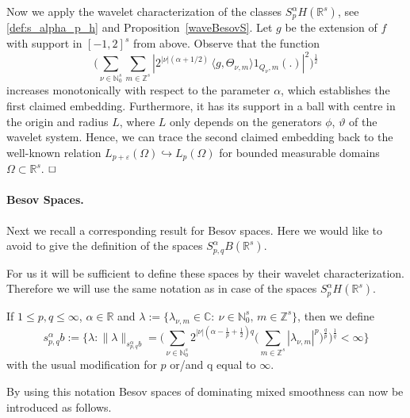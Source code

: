 \documentclass[12pt]{article}
\newenvironment{proof}{\begin{trivlist}
    \item[\hskip\labelsep{\it Proof.}]}{$\hfill\Box$\end{trivlist}}
\newcommand{\real}{\mathbb{R}}
\begin{document}
\begin{proof}
Now we  apply the wavelet characterization of the classes  $S^{\alpha}_{p}H(\real^s)$, see \eqref{def:s_alpha_p_h} and Proposition~\ref{waveBesovS}.  
Let $g$ be the extension of $f$ with support in $[-1,2]^s$ from above.
Observe that the function 
\[
\Big(\sum_{{\nu}\in \mathbb{N}_0^s}\sum_{{m}\in \mathbb{Z}^s}|2^{|{\nu}| (\alpha + 1/2)} \,	\langle g, \Theta_{\nu,m} \rangle 1_{Q_{\nu},{m}}(.) 
|^2\Big)^{\frac{1}{2}}
\]
increases monotonically with respect to the parameter $\alpha$, which establishes the first claimed embedding. Furthermore, it 
has its support in a ball with centre in the origin and radius $L$, where $L$ only depends on the generators $\phi$, $\vartheta$ of the wavelet system. 
Hence, we can  trace the second claimed embedding back to the well-known relation 
$L_{p+\varepsilon}(\Omega) \hookrightarrow L_{p}(\Omega)$
for bounded measurable domains $\Omega \subset \real^s$.
\end{proof}
  
  
\paragraph{Besov Spaces.}

Next we recall a corresponding result for Besov spaces.
Here we would like to avoid to give  the definition of the spaces $S^\alpha_{p,q}B(\real^s)$.

For us it will be sufficient to define these spaces by their wavelet characterization.
Therefore we will use the same notation as in case of the spaces $S^\alpha_{p}H(\real^s)$.

If $1\le p,q\leq \infty$, $\alpha \in \mathbb{R}$ and
	$\lambda:=\lbrace \lambda_{{\nu},{m}}\in\mathbb{C}:~{\nu}\in \mathbb{N}_0^s,  \, {m}\in \mathbb{Z}^s \rbrace$,
	then we define
$$
s_{p,q}^\alpha b := \Big\lbrace\lambda: \| \lambda \|_{s_{p,q}^\alpha b} =
\Big(\sum_{{\nu}\in \mathbb{N}_0^s}2^{|{\nu}| (\alpha -\frac{1}{p}+\frac 12 )q}\big(\sum_{{m}\in \mathbb{Z}^s}|\lambda_{{\nu},{m}} 
|^p\big)^{\frac{q}{p}}\Big)^{\frac{1}{q}}<\infty \Big\rbrace$$
with the usual modification for $p$ or/and q equal to $\infty$.



By using this notation Besov spaces of dominating mixed smoothness can now be introduced as follows.
\end{document}
